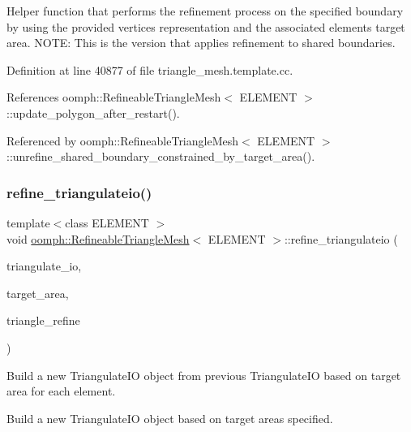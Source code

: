 Helper function that performs the refinement process on the specified boundary by using the provided vertices representation and the associated elements target area. N\+O\+TE\+: This is the version that applies refinement to shared boundaries. 



Definition at line 40877 of file triangle\+\_\+mesh.\+template.\+cc.



References oomph\+::\+Refineable\+Triangle\+Mesh$<$ E\+L\+E\+M\+E\+N\+T $>$\+::update\+\_\+polygon\+\_\+after\+\_\+restart().



Referenced by oomph\+::\+Refineable\+Triangle\+Mesh$<$ E\+L\+E\+M\+E\+N\+T $>$\+::unrefine\+\_\+shared\+\_\+boundary\+\_\+constrained\+\_\+by\+\_\+target\+\_\+area().

\mbox{\label{classoomph_1_1RefineableTriangleMesh_aad5cd84d53d6a902a47fda4bcc734e40}} 
\subsubsection{\texorpdfstring{refine\+\_\+triangulateio()}{refine\_triangulateio()}}
{\footnotesize\ttfamily template$<$class E\+L\+E\+M\+E\+NT $>$ \\
void \hyperlink{classoomph_1_1RefineableTriangleMesh}{oomph\+::\+Refineable\+Triangle\+Mesh}$<$ E\+L\+E\+M\+E\+NT $>$\+::refine\+\_\+triangulateio (\begin{DoxyParamCaption}\item[{Triangulate\+IO \&}]{triangulate\+\_\+io,  }\item[{const Vector$<$ double $>$ \&}]{target\+\_\+area,  }\item[{Triangulate\+IO \&}]{triangle\+\_\+refine }\end{DoxyParamCaption})\hspace{0.3cm}{\ttfamily [protected]}}



Build a new Triangulate\+IO object from previous Triangulate\+IO based on target area for each element. 

Build a new Triangulate\+IO object based on target areas specified. 

